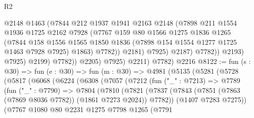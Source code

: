 \begin{lexlean}{R2}
\begin{coremodule}
                              @2148
                              @1463
                              (@7844
                                @212
                                @1937
                                @1941
                                @2163
                                @2148
                                (@7898
                                  @211
                                  @1554
                                  @1936
                                  @1725
                                  @2162
                                  @7928
                                  (@7767
                                    @159
                                    @80
                                    @1566
                                    @1275
                                    @1836
                                    @1265
                                    (@7844
                                      @158
                                      @1556
                                      @1565
                                      @1850
                                      @1836
                                      (@7898 @154 @1554 @1277 @1725 @1463 @7928 @7925)
                                      @1863)
                                    @7782))
                                @2181)
                              @7925)
                            @2187)
                          @7782))
                      @2193)
                    @7925)
                  @2199)
                @7782))
            @2205)
          @7925)
        @2211)
      @7782)
    @2216
@8122 := fun (s : @30) =>
  fun (e : @30) =>
  fun (m : @30) =>
  @4981
    (@5135
      (@5281
        (@5728
          (@5817
            (@6068
              (@6224
                (@6308
                  (@7057
                    (@7212
                      (fun ("_" : @7213) =>
                      @7789
                        (fun ("_" : @7790) =>
                        @7804
                          (@7810
                            (@7821
                              (@7837
                                (@7843
                                  (@7851 (@7863 (@7869 @8036 @7782)) (@1861 @7273 @2024))
                                  @7782))
                              (@1407 @7283 @7275))
                            (@7767
                              @1080
                              @80
                              @2231
                              @1275
                              @7798
                              @1265
                              (@7791

\end{coremodule}
\end{lexlean}
